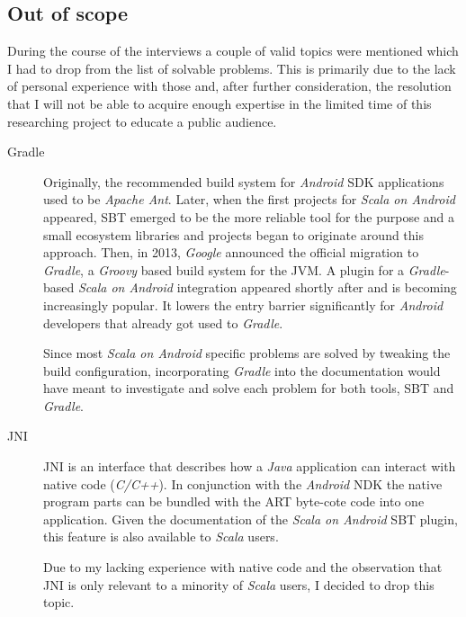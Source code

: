 \subsection{Out of scope}

During the course of the interviews a couple of valid topics were mentioned which I had to drop from the list of solvable problems. This is primarily due to the lack of personal experience with those and, after further consideration, the resolution that I will not be able to acquire enough expertise in the limited time of this researching project to educate a public audience.

\begin{description}

	\item[Gradle]\hfill

	Originally, the recommended build system for \textit{Android} \ac{SDK} applications used to be \textit{Apache Ant}. Later, when the first projects for \textit{Scala on Android} appeared, \ac{SBT} emerged to be the more reliable tool for the purpose and a small ecosystem libraries and projects began to originate around this approach. Then, in 2013, \textit{Google} announced the official migration to \textit{Gradle}, a \textit{Groovy} based build system for the \ac{JVM}. A plugin for a \textit{Gradle}-based \textit{Scala on Android} integration appeared shortly after and is becoming increasingly popular. It lowers the entry barrier significantly for \textit{Android} developers that already got used to \textit{Gradle}.

	Since most \textit{Scala on Android} specific problems are solved by tweaking the build configuration, incorporating \textit{Gradle} into the documentation would have meant to investigate and solve each problem for both tools, \ac{SBT} and \textit{Gradle}.

	\item[JNI]\hfill

	\ac{JNI} is an interface that describes how a \textit{Java} application can interact with native code (\textit{C/C++}). In conjunction with the \textit{Android} \ac{NDK} the native program parts can be bundled with the \ac{ART} byte-cote code into one application. Given the documentation of the \textit{Scala on Android} \ac{SBT} plugin, this feature is also available to \textit{Scala} users.

	Due to my lacking experience with native code and the observation that \ac{JNI} is only relevant to a minority of \textit{Scala} users, I decided to drop this topic.

\end{description}
